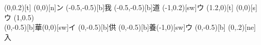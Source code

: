 \documentclass[m_shidai]{subfiles}
\begin{document}
\HUGE
\noindent
{}%
\karifu(0,0.2)[t]{}
       {\chi\moji(0,0)[n]{ン}}
\karifu(-0.5,-0.5)[b]{我}
       {\ataru{\c}\kili\yurisori{\c}\modori
        \woo\長[e]\kili\woo\矢[w]\modori\woo\長[e]}
\karifu(-0.5,-0.5)[b]{道}
       {\chikara{\w}\yurikake{\c}\moji(-1,0.2)[sw]{ウ}
        \kili\yurisori{\c}\modori\woo}
\karifu(1.2,0)[t]{}
       {\sori{\w}\moji(0,0)[s]{ウ}
       \iromodori\sori{\w}\kak\kili
       \moveTo(1,0.5)\sho\kiri
       \chikara{\q}\modori\yurugu{\s}}\\
%
\karifu(0,-0.5)[b]{華}{\kak\modori\chi\kak\modori\kak\moji(0,0)[sw]{イ}}
\karifu(0,-0.5)[b]{供}{\kak\modori\chi\矢[ne]}
\karifu(0,-0.5)[b]{養}{\yurikake{\c}\moji(-1,0)[sw]{ウ}\kili\yurisori{\c}%
            \modori\woo\長[e]}
\karifu(0,-0.5)[b]{}
           {\woo{}\kili[sw]%
            \woo\modoli{}\chi\tsu\moji(0,.2)[ne]{入}}\\
\end{document}
